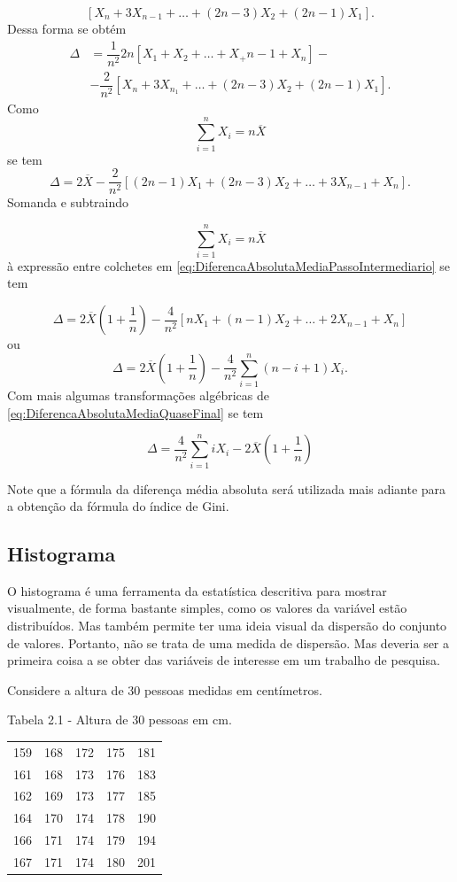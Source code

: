 \documentclass[
]{book}
\begin{document}
\[
  \left[X_n + 3X_{n-1} + \ldots + (2n - 3)X_2 + (2n - 1)X_1  \right].
\]
Dessa forma se obtém
\[
  \begin{split}
    \Delta    & = \dfrac{1}{n^2} 2n\left[ X_1 + X_2 + \ldots + X_+{n-1} + X_n \right] - \\
              & - \dfrac{2}{n^2}\left[  X_n + 3X_{n_1} + \ldots + (2n-3)X_2 + (2n-1)X_1 \right].
  \end{split}
\]
Como
\[
  \sum_{i=1}^{n}X_i = n \overline{X}
\]
se tem
\[
  \Delta = 2\overline{X} - \dfrac{2}{n^2}\left[ (2n-1)X_1 + (2n-3)X_2 + \ldots + 3X_{n-1} + X_n \right].
  \label{eq:DiferencaAbsolutaMediaPassoIntermediario}
\]
Somanda e subtraindo

\[
  \sum_{i=1}^{n}X_i = n\overline{X} 
\]
à expressão entre colchetes em \eqref{eq:DiferencaAbsolutaMediaPassoIntermediario} se tem

\[
  \Delta = 2\overline{X} \left( 1 + \dfrac{1}{n} \right) - \dfrac{4}{n^2} \left[ nX_1 + (n-1)X_2 + \ldots + 2X_{n-1} + X_n  \right]
\]
ou
\[
  \Delta = 2\overline{X} \left( 1 + \dfrac{1}{n} \right) - \dfrac{4}{n^2} \sum_{i=1}^{n}(n-i+1)X_i.
  \label{eq:DiferencaAbsolutaMediaQuaseFinal}
\]
Com mais algumas transformações algébricas de \eqref{eq:DiferencaAbsolutaMediaQuaseFinal} se tem

\[
  \Delta = \dfrac{4}{n^2} \sum_{i=1}^{n} iX_i - 2\overline{X}\left( 1 + \dfrac{1}{n} \right)
  \label{eq:DiferencaAbsolutaMediaFinal}
\]

Note que a fórmula da diferença média absoluta será utilizada mais adiante para a obtenção da fórmula do índice de Gini.

\hypertarget{histograma}{%
\subsection{Histograma}\label{histograma}}

O histograma é uma ferramenta da estatística descritiva para mostrar visualmente, de forma bastante simples, como os valores da variável estão distribuídos. Mas também permite ter uma ideia visual da dispersão do conjunto de valores. Portanto, não se trata de uma medida de dispersão. Mas deveria ser a primeira coisa a se obter das variáveis de interesse em um trabalho de pesquisa.

Considere a altura de 30 pessoas medidas em centímetros.

Tabela 2.1 - Altura de 30 pessoas em cm.

\begin{longtable}[]{@{}ccccc@{}}
\toprule
\endhead
159 & 168 & 172 & 175 & 181\tabularnewline
161 & 168 & 173 & 176 & 183\tabularnewline
162 & 169 & 173 & 177 & 185\tabularnewline
164 & 170 & 174 & 178 & 190\tabularnewline
166 & 171 & 174 & 179 & 194\tabularnewline
167 & 171 & 174 & 180 & 201\tabularnewline
\bottomrule
\end{longtable}
\end{document}
